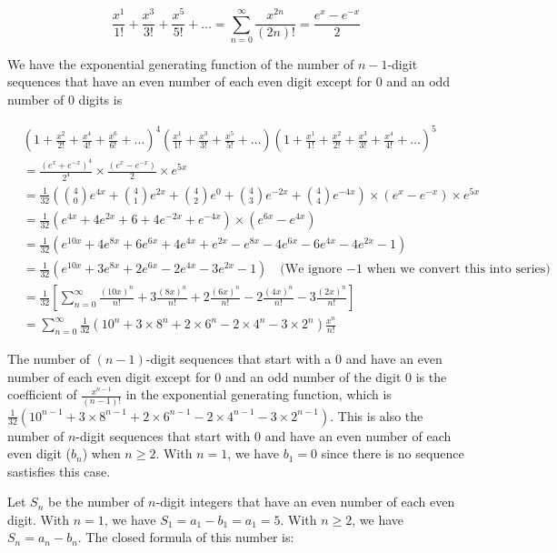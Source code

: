\documentclass[10pt]{article}
\begin{document}
\begin{enumerate}
$$\frac{x^1}{1!}+\frac{x^3}{3!} + \frac{x^5}{5!} +\ldots=\sum\limits^{\infty}_{n=0}\frac{x^{2n}}{(2n)!}=\frac{e^x-e^{-x}}{2}$$

We have the exponential generating function of the number of $n-1$-digit sequences that have an even number of each even digit except for $0$ and an odd number of $0$ digits is

\begin{align*}
    &\left(1 + \frac{x^2}{2!}+\frac{x^4}{4!} + \frac{x^6}{6!} +\ldots\right)^4\left(\frac{x^1}{1!}+\frac{x^3}{3!} + \frac{x^5}{5!} +\ldots\right)\left(1 + \frac{x^1}{1!} + \frac{x^2}{2!}+ \frac{x^3}{3!}+\frac{x^4}{4!}  +\ldots\right)^5 \\
    &=\frac{(e^x+e^{-x})^4}{2^4} \times \frac{(e^x-e^{-x})}{2} \times e^{5x}\\
    &= \frac{1}{32} \left( \binom{4}{0}e^{4x} + \binom{4}{1}e^{2x} + \binom{4}{2}e^{0} + \binom{4}{3}e^{-2x} + \binom{4}{4}e^{-4x} \right) \times \left(e^x-e^{-x}\right) \times e^{5x} \\
    &= \frac{1}{32} \left( e^{4x} + 4e^{2x} + 6 + 4e^{-2x} + e^{-4x} \right) \times (e^{6x} - e^{4x}) \\
    &= \frac{1}{32} \left( e^{10x} + 4e^{8x} + 6e^{6x} + 4e^{4x} + e^{2x} - e^{8x}-4e^{6x}-6e^{4x}-4e^{2x}-1\right)\\
    &= \frac{1}{32} \left( e^{10x} + 3e^{8x} + 2e^{6x} - 2e^{4x} - 3e^{2x}-1\right) \quad \text{(We ignore $-1$ when we convert this into series)}\\
    &= \frac{1}{32} \left[\sum\limits_{n=0}^{\infty}\frac{(10x)^n}{n!} + 3\frac{(8x)^n}{n!}+2\frac{(6x)^n}{n!}-2\frac{(4x)^n}{n!}-3\frac{(2x)^n}{n!}\right]\\
    &=\sum\limits_{n=0}^{\infty}\frac{1}{32} \left(10^n+ 3\times 8^n+2\times 6^n-2\times 4^n - 3 \times 2^n\right)\frac{x^n}{n!}
\end{align*}

The number of $(n-1)$-digit sequences that start with a $0$ and have an even number of each even digit except for $0$ and an odd number of the digit $0$ is the coefficient of $\frac{x^{n-1}}{(n-1)!}$ in the exponential generating function, which is $\frac{1}{32} \left(10^{n-1}+ 3\times 8^{n-1}+2\times 6^{n-1}-2\times 4^{n-1} - 3 \times 2^{n-1}\right)$. This is also the number of $n$-digit sequences that start with $0$ and have an even number of each even digit ($b_n$) when $n \geq 2$. With $n=1$, we have $b_1= 0$ since there is no sequence sastisfies this case.

Let $S_n$ be the number of $n$-digit integers that have an even number of each even digit. With $n = 1$, we have $S_1 = a_1 - b_1 = a_1=5$. With $n \geq 2$, we have $S_n=a_n - b_n$. The closed formula of this number is:


\end{enumerate}
\end{document}

